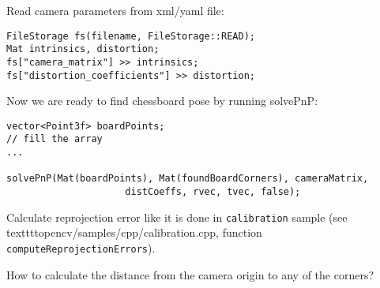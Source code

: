 Read camera parameters from xml/yaml file:
\begin{lstlisting}
FileStorage fs(filename, FileStorage::READ);
Mat intrinsics, distortion;
fs["camera_matrix"] >> intrinsics;
fs["distortion_coefficients"] >> distortion;
\end{lstlisting}

Now we are ready to find chessboard pose by running solvePnP:
\begin{lstlisting}
vector<Point3f> boardPoints;
// fill the array
...

solvePnP(Mat(boardPoints), Mat(foundBoardCorners), cameraMatrix,
                     distCoeffs, rvec, tvec, false);
\end{lstlisting}

Calculate reprojection error like it is done in \texttt{calibration} sample (see textttt{opencv/samples/cpp/calibration.cpp}, function \texttt{computeReprojectionErrors}). 

How to calculate the distance from the camera origin to any of the corners? 
\fi